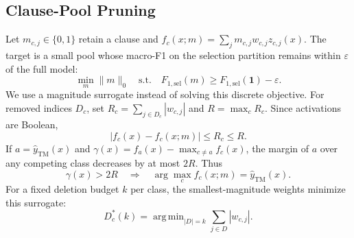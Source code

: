 \documentclass[conference]{IEEEtran}
\begin{document}
\subsection{Clause-Pool Pruning}
\label{sec:prune}
Let $m_{c,j}\in\{0,1\}$ retain a clause and
$f_c(x;m)=\sum_j m_{c,j}w_{c,j}z_{c,j}(x)$. The target is a small
pool whose macro-F1 on the selection partition remains within
$\varepsilon$ of the full model:
\begin{equation}
 \min_m\|m\|_0\quad\text{s.t.}\quad
 F_{1,\mathrm{sel}}(m)\ge F_{1,\mathrm{sel}}(\mathbf1)-\varepsilon.
 \label{eq:prune}
\end{equation}
We use a magnitude surrogate instead of solving this discrete objective.
For removed indices $D_c$, set
$R_c=\sum_{j\in D_c}|w_{c,j}|$ and $R=\max_cR_c$.
Since activations are Boolean,
\begin{equation}
 |f_c(x)-f_c(x;m)|\le R_c\le R.
 \label{eq:perturb}
\end{equation}
If $a=\hat y_{\mathrm{TM}}(x)$ and
$\gamma(x)=f_a(x)-\max_{c\ne a}f_c(x)$, the margin of $a$ over any
competing class decreases by at most $2R$. Thus
\begin{equation}
 \gamma(x)>2R\quad\Longrightarrow\quad
 \arg\max_c f_c(x;m)=\hat y_{\mathrm{TM}}(x).
 \label{eq:margin}
\end{equation}
For a fixed deletion budget $k$ per class, the smallest-magnitude
weights minimize this surrogate:
\begin{equation}
 D_c^*(k)=\operatorname{arg\,min}_{|D|=k}
                   \sum_{j\in D}|w_{c,j}|.
 \label{eq:greedy}
\end{equation}
\end{document}
